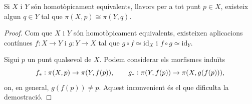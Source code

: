 \documentclass[../main.tex]{subfiles}
\begin{document}
\begin{ter}
\label{ter:invarianciahomotopicadelgrupfonamental} Si $X$ i $Y$ són homotòpicament equivalents, llavors per a tot punt $p\in X$, existeix algun $q\in Y$ tal que $\pi(X,p)\cong\pi(Y,q)$.
\end{ter}
\begin{proof}
Com que $X$ i $Y$ són homotòpicament equivalents, existeixen aplicacions contínues $f:X\rightarrow Y$ i $g:Y\rightarrow X$ tal que $g\circ f \simeq\mathrm{id}_X$ i $f\circ g\simeq\mathrm{id}_Y$.

Sigui $p$ un punt qualsevol de $X$. Podem considerar els morfismes induïts
\begin{equation}
    \notag
    f_*:\pi(X,p)\rightarrow \pi(Y,f(p)),\qquad g_*:\pi(Y,f(p))\rightarrow \pi(X,g(f(p))),
\end{equation}
on, en general, $g(f(p))\not=p$. Aquest inconvenient és el que dificulta la demostració.


\end{proof}
\end{document}

